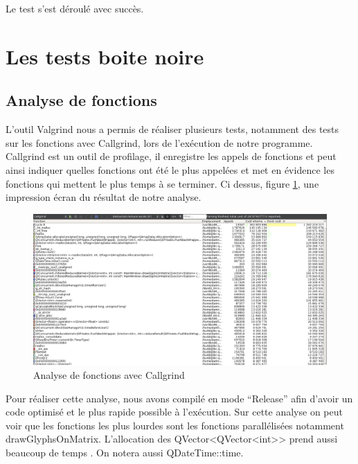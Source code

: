 \documentclass[12pt]{article}
\begin{document}
	Le test s’est déroulé avec succès. \\
	
	\newpage
	\section{Les tests boite noire}	
		\subsection{Analyse de fonctions}
		L’outil Valgrind nous a permis de réaliser plusieurs tests, notamment des tests sur les
		fonctions avec Callgrind, lors de l'exécution de notre programme.\\
		Callgrind est un outil de profilage, il enregistre les appels de fonctions et peut
		ainsi indiquer quelles fonctions ont été le plus appelées et met en évidence les fonctions
		qui mettent le plus temps à se terminer.
		Ci dessus, figure \ref{fig:callgrind}, une impression écran du résultat de notre analyse.\\
	
		\begin{figure}[!h]
		\begin{center}
		\includegraphics[scale=.38]{callgrind_analyse.png}
		\caption{Analyse de fonctions avec Callgrind}
		\label{fig:callgrind}
		\end{center}
		\end{figure}
	
		Pour réaliser cette analyse, nous avons compilé en mode “Release” afin d’avoir
		un code optimisé et le plus rapide possible à l’exécution.
		Sur cette analyse on peut voir que les fonctions les plus lourdes sont les fonctions
		parallélisées notamment drawGlyphsOnMatrix. L’allocation des QVector<QVector<int>>
		prend aussi beaucoup de temps . On notera aussi QDateTime::time.
		
\end{document}
